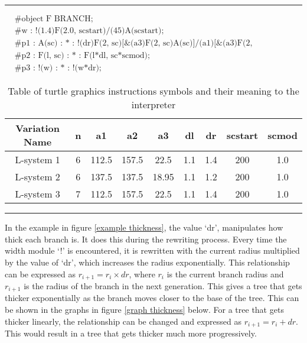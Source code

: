 \vspace{10mm}
\hrule
\begin{singlespace}
\begin{equation}
\begin{aligned}
	&\textrm{\#object F BRANCH;}\\
	&\textrm{\#w : !(1.4)F(2.0, scstart)/(45)A(scstart);}\\
	&\textrm{\#p1 : A(sc) : * : !(dr)F(2, sc)[\&(a3)F(2, sc)A(sc)]/(a1)[\&(a3)F(2, sc)A(sc)]/(a2)[\&(a3)F(2, sc)A(sc)];}\\
	&\textrm{\#p2 : F(l, sc) : * : F(l*dl, sc*scmod);}\\
	&\textrm{\#p3 : !(w) : * : !(w*dr);}
\end{aligned}
\end{equation}
\end{singlespace}

\begin{table}[h!]
\centering
\begin{tabular}{ | c | c | c | c | c | c | c | c | c | }
\hline
	Variation Name & n & a1 & a2 & a3 & dl & dr & scstart & scmod\\  
\hline
\hline
	L-system 1  & 6 & 112.5 & 157.5 & 22.5 & 1.1 & 1.4 & 200 & 1.0 \\
\hline
	L-system 2  & 6 & 137.5 & 137.5 & 18.95 & 1.1 & 1.2 & 200 & 1.0 \\
\hline
	L-system 3  & 7 & 112.5 & 157.5 & 22.5 & 1.1 & 1.4 & 200 & 1.0 \\
\hline
\end{tabular}
\caption{Table of turtle graphics instructions symbols and their meaning to the interpreter}
\label{L-system params}
\end{table}
\FloatBarrier
\hrule

\vspace{10mm} 

\noindent
In the example in figure \ref{example thickness}, the value `dr', manipulates how thick each branch is. It does this during the rewriting process. Every time the width module `!' is encountered, it is rewritten with the current radius multiplied by the value of `dr', which increases the radius exponentially. This relationship can be expressed as $r_{i+1} = r_i \times dr$, where $r_i$ is the current branch radius and $r_{i+1}$ is the radius of the branch in the next generation. This gives a tree that gets thicker exponentially as the branch moves closer to the base of the tree. This can be shown in the graphs in figure \ref{graph thickness} below. For a tree that gets thicker linearly, the relationship can be changed and expressed as $r_{i+1} = r_i + dr$. This would result in a tree that gets thicker much more progressively.

